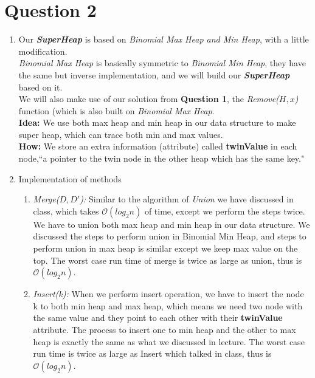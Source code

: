 \documentclass[10pt]{article}
\begin{document}
\section*{Question 2}
\begin{enumerate}
\item
Our \textbf{\textit{SuperHeap}} is based on \textit{Binomial Max Heap and Min Heap}, with a little modification.\\
\textit{Binomial Max Heap} is basically symmetric to \textit{Binomial Min Heap}, they have the same but inverse implementation, and we will build our \textbf{\textit{SuperHeap}} based on it.\\
We will also make use of our solution from \textbf{Question 1}, the \textit{Remove($H, x$)} function (which is also built on \textit{Binomial Max Heap}.\\
\textbf{Idea:} We use both max heap and min heap in our data structure to make super heap, which can trace both min and max values.\\
\textbf{How:} We store an extra information (attribute) called \textbf{twinValue} in each node,``a pointer to the twin node in the other heap which has the same key."\\

\item Implementation of methods
\begin{enumerate}
\item \textit{Merge($D, D'$):}
Similar to the algorithm of \textit{Union} we have discussed in class, which takes $\mathcal{O}(log_2n)$ of time, except we perform the steps twice. We have to union both max heap and min heap in our data structure. We discussed the steps to perform union in Binomial Min Heap, and steps to perform union in max heap is similar except we keep max value on the top. The worst case run time of merge is twice as large as union, thus is $\mathcal{O}(log_2n)$.

\item \textit{Insert(k):} 
When we perform insert operation, we have to insert the node k to both min heap and max heap, which means we need two node with the same value and they point to each other with their \textbf{twinValue} attribute. The process to insert one to min heap and the other to max heap is exactly the same as what we discussed in lecture. The worst case run time is twice as large as Insert which talked in class, thus is $\mathcal{O}(log_2n)$.


\end{enumerate}
\end{enumerate}
\end{document}
